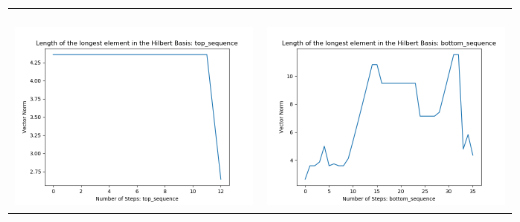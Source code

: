 \documentclass[10pt]{article}
\begin{document}
\begin{tabular}{c|c}
\begin{minipage}{.45\textwidth}
\end{minipage} \\ \\
\hline \\\begin{minipage}{.45\textwidth}
\includegraphics[width=\textwidth]{"DATA/4d/4 generators 2 bound A/top_sequence LENGTH"}
\end{minipage} &
\begin{minipage}{.45\textwidth}
\includegraphics[width=\textwidth]{"DATA/4d/4 generators 2 bound A bottomup/bottom_sequence LENGTH"}
\end{minipage}
\end{tabular}
\end{document}
